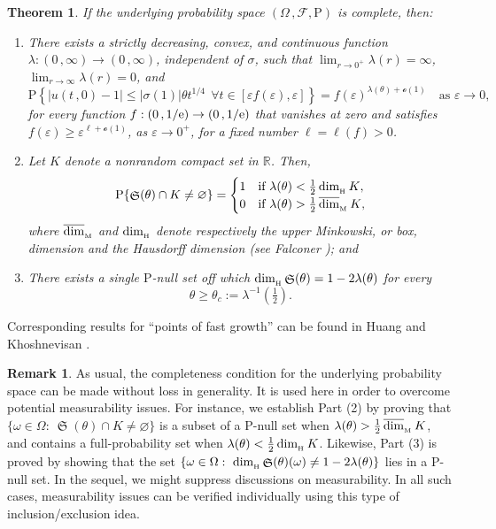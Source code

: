 \documentclass[reqno]{amsart}
\DeclareMathOperator{\dimh}{dim_{_{\rm H}}}
\DeclareMathOperator{\dimm}{\overline{dim}_{_{\rm M}}}
\DeclareMathOperator{\fS}{\mathfrak S}
\newcommand{\<}{\langle}
\renewcommand{\>}{\rangle}
\newcommand{\R}{\mathbb{R}}
\renewcommand{\P}{\mathrm{P}}
\newcommand{\1}{\mathbb{1}}
\newcommand{\e}{{\rm e}}
\renewcommand{\ge}{\geqslant}
\renewcommand{\le}{\leqslant}
\newtheorem{theorem}[stat]{Theorem}
\theoremstyle{definition}
\newtheorem{remark}[stat]{Remark}
\numberwithin{equation}{section}
\begin{document}
\begin{theorem}\label{th:BC:u}
	If the underlying probability space $(\Omega\,,\mathscr{F},\P)$ is 
	complete, then:
	\begin{enumerate}[\noindent (1)]
	\item There exists a strictly decreasing, convex, 
		and continuous function $\lambda: (0\,,\infty) \to (0\,,\infty)$, 
		independent of $\sigma$, such that $\lim_{r\to0^+} \lambda(r) = \infty$, 
		$\lim_{r \to \infty} \lambda(r) = 0$, and 
		\[
			\P\left\{ |u(t\,,0)-1| \le |\sigma(1)| \theta t^{1/4}\ \ 
			\forall t \in [\varepsilon f(\varepsilon),\varepsilon]\right\} 
			= f(\varepsilon)^{\lambda(\theta)+\mathscr{o}(1)}\quad
			\text{as $\varepsilon\to0$},
		\]
		for every function $f:(0\,,1/\e)\to(0\,,1/\e)$ that vanishes at zero and satisfies
		$f(\varepsilon) \ge \varepsilon^{\ell+\mathscr{o}(1)}$, as $\varepsilon\to0^+$,
		for a fixed number $\ell=\ell(f)>0$.
	\item Let $K$ denote a nonrandom compact set in $\R$. Then,
		\[
			\P\{\fS(\theta)\cap K\neq\varnothing\}=
			\begin{cases}
				1 & \text{if $\lambda(\theta) < \frac12\dimh K$},\\
				0 & \text{if $\lambda(\theta) > \frac12 \dimm K$},
			\end{cases}
		\]
		where $\dimm$ and $\dimh$ denote respectively the upper Minkowski, or box, dimension
		and the Hausdorff dimension (see Falconer \textnormal{\cite{Falconer}}); and
	\item  There exists a single $\P$-null set off which $\dimh \fS(\theta) = 1 - 2\lambda(\theta)$
		for every 
		\begin{equation}\label{theta_c}
			\theta\ge \theta_c := \lambda^{-1}(\tfrac12).
		\end{equation}
	\end{enumerate}
\end{theorem}


Corresponding results for ``points of fast growth'' can be found in Huang and Khoshnevisan
\cite{HuangKh}.

\begin{remark}\label{rem:meas}
	As usual, the completeness condition for the underlying probability space
	can be made without loss in generality. It is used here in order to overcome 
	potential measurability issues. For instance, we establish Part (2) by proving 
	that $\{\omega\in\Omega:\ \fS(\theta)\cap K\neq\varnothing\}$
	is a subset of a $\P$-null set when $\lambda(\theta) > \frac12\dimm K$,
	and contains a full-probability set when $\lambda(\theta) < \frac12\dimh K$.
	Likewise, Part (3) is proved by showing
	that the set $\{\omega\in\Omega:\ \dimh \fS(\theta)(\omega) \neq 1 - 
	2\lambda(\theta)\}$ lies in a $\P$-null set. In the sequel, we 
	might suppress discussions
	on measurability. In all such cases, measurability issues can be verified individually using this type of
	inclusion/exclusion idea.
\end{remark}
\end{document}

